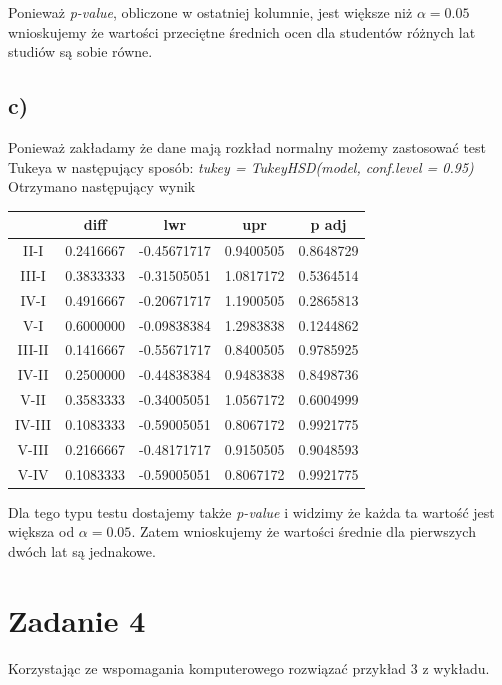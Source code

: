\documentclass{article}
\begin{document}
Ponieważ \textit{p-value}, obliczone w ostatniej kolumnie, jest większe niż $\alpha = 0.05$ wnioskujemy że wartości przeciętne średnich ocen dla studentów różnych lat studiów są sobie równe.

\subsection{c)}
Ponieważ zakładamy że dane mają rozkład normalny możemy zastosować test Tukeya w następujący sposób: \textit{tukey = TukeyHSD(model, conf.level = 0.95)}
Otrzymano następujący wynik
\begin{center} \begin{tabular}{|c|c|c|c|c|} \hline
& diff & lwr & upr & p adj \\ \hline
II-I & 0.2416667 & -0.45671717 & 0.9400505 & 0.8648729 \\ \hline
III-I & 0.3833333 & -0.31505051 & 1.0817172 & 0.5364514 \\ \hline
IV-I & 0.4916667 & -0.20671717 & 1.1900505 & 0.2865813 \\ \hline
V-I & 0.6000000 & -0.09838384 & 1.2983838 & 0.1244862 \\ \hline
III-II & 0.1416667 & -0.55671717 & 0.8400505 & 0.9785925 \\ \hline
IV-II & 0.2500000 & -0.44838384 & 0.9483838 & 0.8498736 \\ \hline
V-II & 0.3583333 & -0.34005051 & 1.0567172 & 0.6004999 \\ \hline
IV-III & 0.1083333 & -0.59005051 & 0.8067172 & 0.9921775 \\ \hline
V-III & 0.2166667 & -0.48171717 & 0.9150505 & 0.9048593 \\ \hline
V-IV & 0.1083333 & -0.59005051 & 0.8067172  & 0.9921775 \\ \hline
\end{tabular} \end{center}

Dla tego typu testu dostajemy także \textit{p-value} i widzimy że każda ta wartość jest większa od $\alpha = 0.05$. Zatem wnioskujemy że wartości średnie dla pierwszych dwóch lat są jednakowe.

\newpage
\section{Zadanie 4}
Korzystając ze wspomagania komputerowego rozwiązać przykład 3 z wykładu. \\ \par
\end{document}
